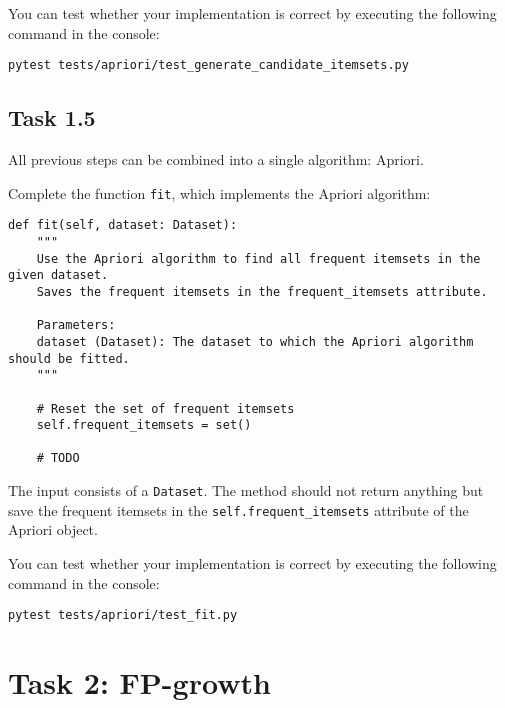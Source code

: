 \documentclass[
english,
smallborders
]{i6prcsht}
\begin{document}
You can test whether your implementation is correct by executing the following command in the console:

\vspace*{0.3cm}

\begin{lstlisting}
pytest tests/apriori/test_generate_candidate_itemsets.py
\end{lstlisting}

\vspace*{0.1cm}

\subsection*{Task 1.5}

All previous steps can be combined into a single algorithm: Apriori.

Complete the function \texttt{fit}, which implements the Apriori algorithm:

\vspace*{0.3cm}

\begin{lstlisting}
def fit(self, dataset: Dataset):
	"""
	Use the Apriori algorithm to find all frequent itemsets in the given dataset.
	Saves the frequent itemsets in the frequent_itemsets attribute.

	Parameters:
	dataset (Dataset): The dataset to which the Apriori algorithm should be fitted.
	"""

	# Reset the set of frequent itemsets
	self.frequent_itemsets = set()

	# TODO
\end{lstlisting}

\vspace*{0.1cm}

The input consists of a \texttt{Dataset}. The method should not return anything but save the frequent itemsets in the \texttt{self.frequent\_itemsets} attribute of the Apriori object.

You can test whether your implementation is correct by executing the following command in the console:

\vspace*{0.3cm}

\begin{lstlisting}
pytest tests/apriori/test_fit.py
\end{lstlisting}


\newpage

\section*{Task 2: FP-growth}
\label{sec:task-two}
\end{document}
